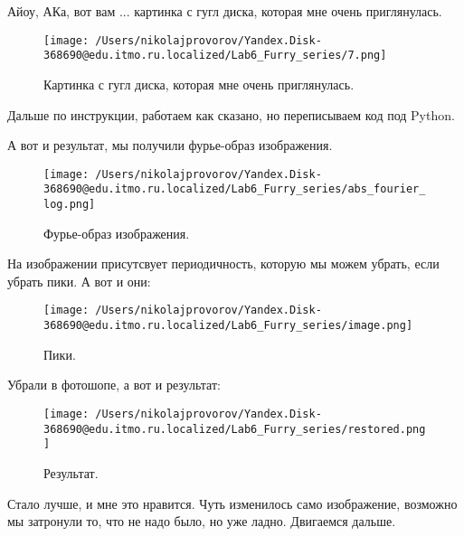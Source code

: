 Айоу, АКа, вот вам ... картинка с гугл диска, которая мне очень приглянулась.

\begin{figure}[ht!]
    \centering
    \texttt{[image: /Users/nikolajprovorov/Yandex.Disk-368690@edu.itmo.ru.localized/Lab6\_Furry\_series/7.png]}
    \caption{Картинка с гугл диска, которая мне очень приглянулась.}
    \label{fig:Source_img_1}
\end{figure}

Дальше по инструкции, работаем как сказано, но переписываем код под Python.

А вот и результат, мы получили фурье-образ изображения.

\begin{figure}[ht!]
    \centering
    \texttt{[image: /Users/nikolajprovorov/Yandex.Disk-368690@edu.itmo.ru.localized/Lab6\_Furry\_series/abs\_fourier\_log.png]}
    \caption{Фурье-образ изображения.}
\end{figure}

\clearpage

На изображении присутсвует периодичность, которую мы можем убрать, если убрать пики. А вот и они:

\begin{figure}[ht!]
    \centering
    \texttt{[image: /Users/nikolajprovorov/Yandex.Disk-368690@edu.itmo.ru.localized/Lab6\_Furry\_series/image.png]}
    \caption{Пики.}
\end{figure}

Убрали в фотошопе, а вот и результат:

\clearpage

\begin{figure}[ht!]
    \centering
    \texttt{[image: /Users/nikolajprovorov/Yandex.Disk-368690@edu.itmo.ru.localized/Lab6\_Furry\_series/restored.png]}
    \caption{Результат.}
\end{figure}

Стало лучше, и мне это нравится. Чуть изменилось само изображение, возможно мы затронули то, что не надо было, но уже ладно. Двигаемся дальше.


